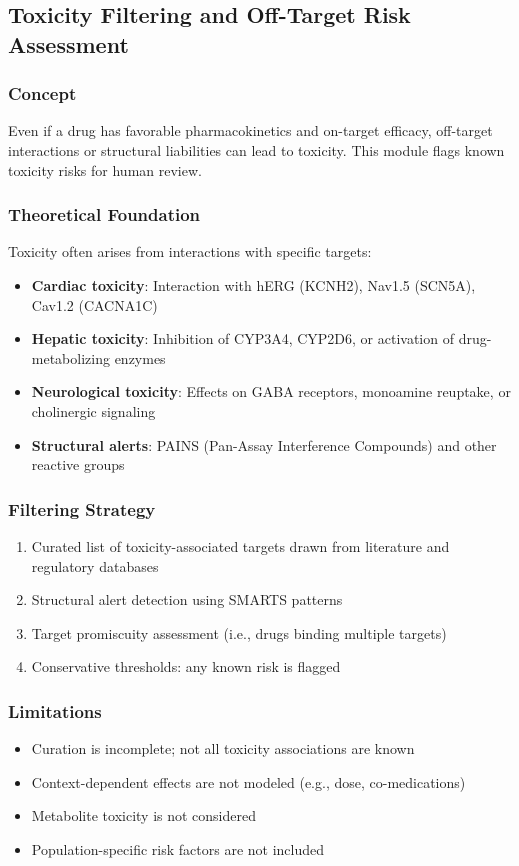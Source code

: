 \documentclass[12pt,a4paper]{article}
\begin{document}
\subsection{Toxicity Filtering and Off-Target Risk Assessment}
\label{subsec:toxicity}

\subsubsection{Concept}
Even if a drug has favorable pharmacokinetics and on-target efficacy, off-target interactions or structural liabilities can lead to toxicity. This module flags known toxicity risks for human review.

\subsubsection{Theoretical Foundation}
Toxicity often arises from interactions with specific targets:
\begin{itemize}
  \item \textbf{Cardiac toxicity}: Interaction with hERG (KCNH2), Nav1.5 (SCN5A), Cav1.2 (CACNA1C)
  \item \textbf{Hepatic toxicity}: Inhibition of CYP3A4, CYP2D6, or activation of drug-metabolizing enzymes
  \item \textbf{Neurological toxicity}: Effects on GABA receptors, monoamine reuptake, or cholinergic signaling
  \item \textbf{Structural alerts}: PAINS (Pan-Assay Interference Compounds) and other reactive groups
\end{itemize}

\subsubsection{Filtering Strategy}
\begin{enumerate}
  \item Curated list of toxicity-associated targets drawn from literature and regulatory databases
  \item Structural alert detection using SMARTS patterns
  \item Target promiscuity assessment (i.e., drugs binding multiple targets)
  \item Conservative thresholds: any known risk is flagged
\end{enumerate}

\subsubsection{Limitations}
\begin{itemize}
  \item Curation is incomplete; not all toxicity associations are known
  \item Context-dependent effects are not modeled (e.g., dose, co-medications)
  \item Metabolite toxicity is not considered
  \item Population-specific risk factors are not included
\end{itemize}
\end{document}
